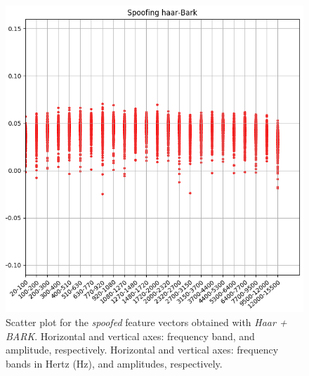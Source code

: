 		\begin{figure}[H]
			\centering
			\includegraphics[scale=.53]{images/results/barkVersusMel/spoofingHaarBark}
			\caption{Scatter plot for the \textit{spoofed} feature vectors obtained with \textit{Haar + BARK}. Horizontal and vertical axes: frequency band, and amplitude, respectively. Horizontal and vertical axes: frequency bands in Hertz (Hz), and amplitudes, respectively.}
			\label{fig:spoofinghaarbark}
		\end{figure}
